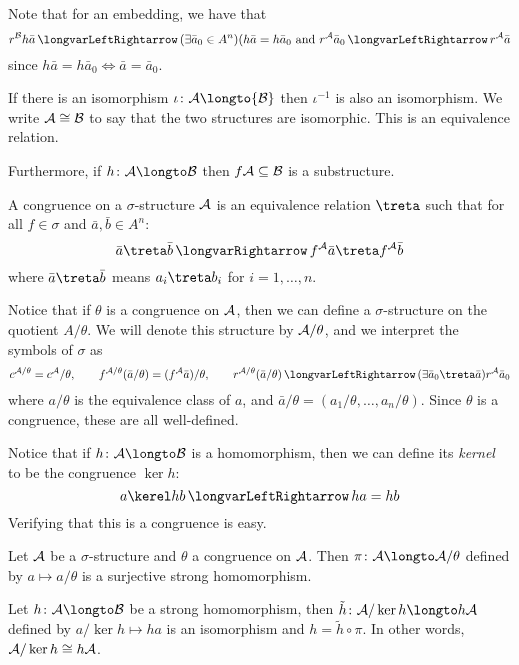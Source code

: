 \edefn

Note that for an embedding, we have that
$$ r^{\cal B}h\bar a \iff (\exists\bar a_0\in A^n)(h\bar a=h\bar a_0\hbox{ and }r^{\cal A}\bar a_0
\iff r^{\cal A}\bar a $$
since $h\bar a=h\bar a_0\iff\bar a=\bar a_0$.

If there is an isomorphism $\iota\colon{\cal A}\longto{\cal B}$ then $\iota^{-1}$ is also an
isomorphism.
We write ${\cal A}\cong{\cal B}$ to say that the two structures are isomorphic.
This is an equivalence relation.

Furthermore, if $h\colon\c A\longto\c B$ then $f{\cal A}\subseteq{\cal B}$ is a substructure.

\bdefn

    A {\emphcolor congruence} on a $\sigma$-structure ${\cal A}$ is an equivalence relation
    $\treta$ such that for all $f\in\sigma$ and $\bar a,\bar b\in A^n$:
    $$ \bar a\treta\bar b \implies f^{\cal A}\bar a\treta f^{\cal A}\bar b $$
    where $\bar a\treta\bar b$ means $a_i\treta b_i$ for $i=1,\dots,n$.

\edefn

Notice that if $\theta$ is a congruence on ${\cal A}$, then we can define a $\sigma$-structure
on the quotient $A/\theta$.
We will denote this structure by ${\cal A}/\theta$, and we interpret the symbols of $\sigma$ as
$$ c^{\c A/\theta} = c^{\c A}/\theta,\qquad
f^{\c A/\theta}(\bar a/\theta) = (f^{\c A}\bar a)/\theta,\qquad
r^{\c A/\theta}(\bar a/\theta) \iff (\exists\bar a_0\treta\bar a)r^{\c A}\bar a_0 $$
where $a/\theta$ is the equivalence class of $a$, and
$\bar a/\theta=(a_1/\theta,\dots,a_n/\theta)$.
Since $\theta$ is a congruence, these are all well-defined.

Notice that if $h\colon\c A\longto\c B$ is a homomorphism, then we can define its {\it kernel}
to be the congruence $\ker h$:
$$ a\kerel hb \iff ha=hb $$
Verifying that this is a congruence is easy.

\bthrm[title=The First Isomorphism Theorem]

    \benum
        \item Let ${\cal A}$ be a $\sigma$-structure and $\theta$ a congruence on ${\cal A}$.
        Then $\pi\colon\c A\longto\c A/\theta$ defined by $a\mapsto a/\theta$ is a surjective
        strong homomorphism.
        \item Let $h\colon\c A\longto\c B$ be a strong homomorphism, then
        $\tilde h\colon\c A/\ker h\longto h\c A$ defined by $a/\ker h\mapsto ha$ is an
        isomorphism and $h=\tilde h\circ\pi$.
        In other words, ${\cal A}/\ker h\cong h{\cal A}$.
    \eenum

